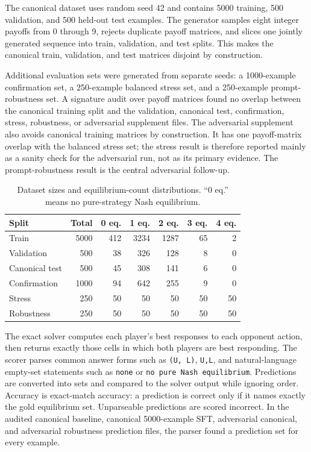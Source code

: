 \documentclass[11pt]{article}
\begin{document}
The canonical dataset uses random seed 42 and contains 5000 training, 500 validation, and 500 held-out test examples. The generator samples eight integer payoffs from 0 through 9, rejects duplicate payoff matrices, and slices one jointly generated sequence into train, validation, and test splits. This makes the canonical train, validation, and test matrices disjoint by construction.

Additional evaluation sets were generated from separate seeds: a 1000-example confirmation set, a 250-example balanced stress set, and a 250-example prompt-robustness set. A signature audit over payoff matrices found no overlap between the canonical training split and the validation, canonical test, confirmation, stress, robustness, or adversarial supplement files. The adversarial supplement also avoids canonical training matrices by construction. It has one payoff-matrix overlap with the balanced stress set; the stress result is therefore reported mainly as a sanity check for the adversarial run, not as its primary evidence. The prompt-robustness result is the central adversarial follow-up.

\begin{table}[!htbp]
\centering
\caption{Dataset sizes and equilibrium-count distributions. ``0 eq.'' means no pure-strategy Nash equilibrium.}
\label{tab:data-distribution}
\begin{tabular}{lrrrrrr}
\toprule
Split & Total & 0 eq. & 1 eq. & 2 eq. & 3 eq. & 4 eq. \\
\midrule
Train & 5000 & 412 & 3234 & 1287 & 65 & 2 \\
Validation & 500 & 38 & 326 & 128 & 8 & 0 \\
Canonical test & 500 & 45 & 308 & 141 & 6 & 0 \\
Confirmation & 1000 & 94 & 642 & 255 & 9 & 0 \\
Stress & 250 & 50 & 50 & 50 & 50 & 50 \\
Robustness & 250 & 50 & 50 & 50 & 50 & 50 \\
\bottomrule
\end{tabular}
\end{table}

The exact solver computes each player's best responses to each opponent action, then returns exactly those cells in which both players are best responding. The scorer parses common answer forms such as \texttt{(U, L)}, \texttt{U,L}, and natural-language empty-set statements such as \texttt{none} or \texttt{no pure Nash equilibrium}. Predictions are converted into sets and compared to the solver output while ignoring order. Accuracy is exact-match accuracy: a prediction is correct only if it names exactly the gold equilibrium set. Unparseable predictions are scored incorrect. In the audited canonical baseline, canonical 5000-example SFT, adversarial canonical, and adversarial robustness prediction files, the parser found a prediction set for every example.
\end{document}
